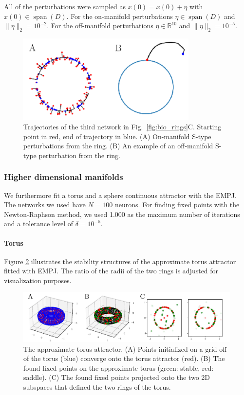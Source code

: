 \documentclass{article} %
\newcounter{ct}
\newcommand{\reals}{\mathbb{R}}
\theoremstyle{definition}
\theoremstyle{remark}
\begin{document}
All of the perturbations were sampled as
\(x(0) = x(0) + \eta\) with \(x(0)\in \operatorname{span}(D)\).
For the on-manifold perturbations \(\eta\in \operatorname{span}(D)\)  and \(\|\eta\|_{2} = 10^{-2}\).
For the off-manifold perturbations \(\eta\in \reals^{10}\) and \(\|\eta\|_{2} = 10^{-5}\).


\begin{figure}[h]
\centering
\includegraphics[width=0.8\textwidth]{empj_onoff_perturbation_s}
\caption{Trajectories of the third network in Fig.~\ref{fig:bio_rings}C. Starting point in red, end of trajectory in blue.
(A) On-manifold S-type perturbations from the ring.
(B) An example of an off-manifold  S-type perturbation from the ring.
}\label{fig:empj_onoff_perturbation}
\end{figure}




\subsubsection{Higher dimensional manifolds}
We furthermore fit a torus and a sphere continuous attractor with the EMPJ.
The networks we used have \(N = 100\) neurons.
For finding fixed points with the Newton-Raphson method, we used 1.000  as the maximum number of iterations  and a tolerance level of \(\delta = 10^{-5}\).

\paragraph{Torus}
Figure \ref{fig:torus_empj} illustrates the stability structures of  the approximate torus attractor fitted with EMPJ.
The ratio of the radii of the two rings is adjusted for visualization purposes.
\begin{figure}[h]
\centering
\includegraphics[width=\textwidth]{torus_empj_ss}
\caption{The approximate torus attractor.
(A) Points initialized on a grid off of the torus (blue) converge onto the torus attractor (red).
(B) The found fixed points on the approximate torus (green: stable, red: saddle).
(C) The found fixed points projected onto the two 2D subspaces that defined the two rings of the torus.
}\label{fig:torus_empj}
\end{figure}
\end{document}
